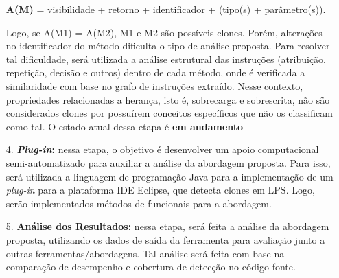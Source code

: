 \begin{itemize}
	\begin{center}
		\textbf{A(M)} = visibilidade + retorno + identificador + (tipo(s) + parâmetro(s)).
	\end{center}
	
	Logo, se A(M1) = A(M2), M1 e M2 são possíveis clones. Porém, alterações no identificador do método dificulta o tipo de análise proposta. Para resolver tal dificuldade, será utilizada a análise estrutural das instruções (atribuição, repetição, decisão e outros) dentro de cada método, onde é verificada a similaridade com base no grafo de instruções extraído. Nesse contexto, propriedades relacionadas a herança, isto é, sobrecarga e sobrescrita, não são considerados clones por possuírem conceitos específicos que não os classificam como tal.
	O estado atual dessa etapa é \textbf{em andamento}

	\item[4.] \textbf{\textit{Plug-in}:} nessa etapa, o objetivo é desenvolver um apoio computacional semi-automatizado para auxiliar a análise da abordagem proposta. Para isso, será utilizada a linguagem de programação Java para a implementação de um \textit{plug-in} para a plataforma IDE Eclipse, que detecta clones em LPS. Logo, serão implementados métodos de funcionais para a abordagem.
	
	\item[5.] \textbf{Análise dos Resultados:} nessa etapa, será feita a análise da abordagem proposta, utilizando os dados de saída da ferramenta para avaliação junto a outras ferramentas/abordagens. Tal análise será feita com base na comparação de desempenho e cobertura de detecção no código fonte.
	
\end{itemize}





